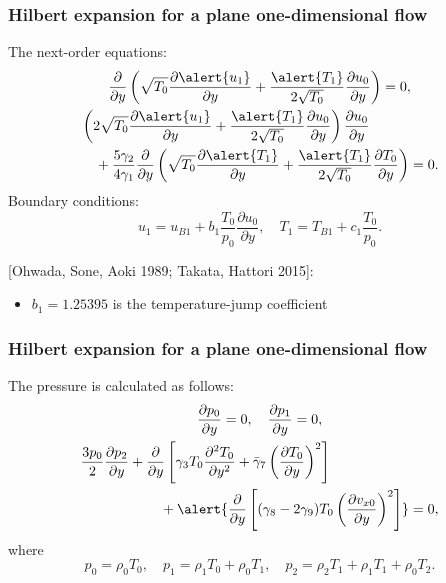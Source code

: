 \documentclass[mathserif]{beamer} %
\newcommand{\pder}[2][]{\frac{\partial#1}{\partial#2}}
\newcommand{\pderdual}[2][]{\frac{\partial^2#1}{\partial#2^2}}
\begin{document}
\begin{frame}
    \frametitle{Hilbert expansion for a plane one-dimensional flow}
    The next-order equations:
    \begin{gather}
        \pder{y}\left( \sqrt{T_0}\pder[\alert{u_1}]{y} + \frac{\alert{T_1}}{2\sqrt{T_0}}\pder[u_0]{y} \right) = 0, \\
        \begin{multlined}[][9cm]
        \left( 2\sqrt{T_0}\pder[\alert{u_1}]{y} + \frac{\alert{T_1}}{2\sqrt{T_0}}\pder[u_0]{y} \right) \pder[u_0]{y} \\
            + \frac{5\gamma_2}{4\gamma_1} \pder{y}\left( \sqrt{T_0}\pder[\alert{T_1}]{y}
            + \frac{\alert{T_1}}{2\sqrt{T_0}}\pder[T_0]{y} \right) = 0.
        \end{multlined}
    \end{gather}
    Boundary conditions:
    \begin{equation}
        u_1 = u_{B1} + b_1 \frac{T_0}{p_0} \pder[u_0]{y}, \quad
        T_1 = T_{B1} + c_1 \frac{T_0}{p_0}.
    \end{equation}

    [Ohwada, Sone, Aoki 1989; Takata, Hattori 2015]:
    \begin{itemize}
        \item \(b_1 = 1.25395\) is the temperature-jump coefficient
    \end{itemize}
\end{frame}

\begin{frame}
    \frametitle{Hilbert expansion for a plane one-dimensional flow}
    The pressure is calculated as follows:
    \begin{gather}
        \pder[p_0]{y} = 0, \quad \pder[p_1]{y} = 0, \label{eq:hilbert_p0_p1} \\
        \begin{multlined}[][9cm]
        \frac{3p_0}{2}\pder[p_2]{y}
            + \pder{y}\left[ \gamma_3 T_0 \pderdual[T_0]{y} + \bar{\gamma}_7\left(\pder[T_0]{y}\right)^2 \right] \\
            + \alert{\pder{y}\left[ (\gamma_8-2\gamma_9)T_0\left(\pder[v_{x0}]{y}\right)^2 \right]} = 0, \label{eq:hilbert_p2}
        \end{multlined}
    \end{gather}
    where
    \begin{equation}\label{eq:hilbert_expansion_p}
        p_0 = \rho_0 T_0, \quad
        p_1 = \rho_1 T_0 + \rho_0 T_1, \quad
        p_2 = \rho_2 T_1 + \rho_1 T_1 + \rho_0 T_2.
    \end{equation}
\end{frame}
\end{document}

